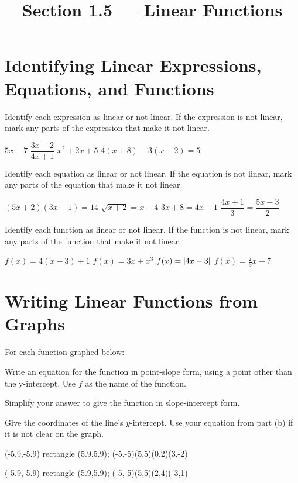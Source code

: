 

\title{Section 1.5 --- Linear Functions}


\maketitle

\section*{Identifying Linear Expressions, Equations, and Functions}
Identify each expression as linear or not linear. If the expression is not linear, mark any parts of the expression that make it not linear.
\begin{smenum}
\mitemxxxx
{$5x-7$}
{$\dfrac{3x-2}{4x+1}$}
{$x^2+2x+5$}
{$4(x+8)-3(x-2)=5$}
\end{smenum}
Identify each equation as linear or not linear. If the equation is not linear, mark any parts of the equation that make it not linear.
\begin{smenum}
\mitemxxxx
{$(5x+2)(3x-1)=14$}
{$\sqrt{x+2}=x-4$}
{$3x+8=4x-1$}
{$\dfrac{4x+1}{3}=\dfrac{5x-3}{2}$}
\end{smenum}
Identify each function as linear or not linear. If the function is not linear, mark any parts of the function that make it not linear.
\begin{smenum}
\mitemxxxx
{$f(x)=4(x-3)+1$}
{$f(x)=3x+x^3$}
{$f(x)=\left|4x-3\right|$}
{$f(x)=\frac{2}{3}x-7$}
\end{smenum}

\section*{Writing Linear Functions from Graphs}
For each function graphed below:
\begin{clist}%
\item Write an equation for the function in point-slope form, using a point other than the y-intercept. Use $f$ as the name of the function.
\item Simplify your answer to give the function in slope-intercept form.
\item Give the coordinates of the line's $y$-intercept. Use your equation from part (b) if it is not clear on the graph.
\end{clist}
\begin{smenum}
\mitemxx
{%
\begin{ilpic}[x=0.2in,y=0.2in]
\useasboundingbox(-5.9,-5.9) rectangle (5.9,5.9);
\DrawGridSquare
\linepoints(-5,-5)(5,5)(0,2)(3,-2)
\end{ilpic}
}{%
\begin{ilpic}[x=0.2in,y=0.2in]
\useasboundingbox(-5.9,-5.9) rectangle (5.9,5.9);
\DrawGridSquare
\linepoints(-5,-5)(5,5)(2,4)(-3,1)
\end{ilpic}
}
\end{smenum}

